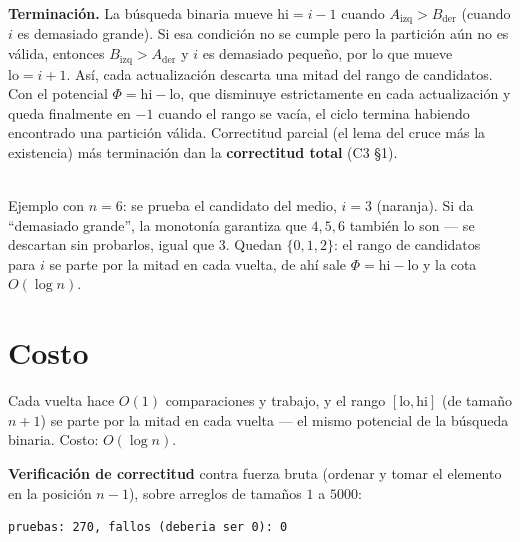 \documentclass[11pt]{article}
\begin{document}
\textbf{Terminación.} La búsqueda binaria mueve $\mathrm{hi}=i{-}1$ cuando $A_{\mathrm{izq}}>B_{\mathrm{der}}$
(cuando $i$ es demasiado grande). Si esa condición no se cumple pero la partición aún no es válida, entonces
$B_{\mathrm{izq}}>A_{\mathrm{der}}$ y $i$ es demasiado pequeño, por lo que mueve $\mathrm{lo}=i{+}1$.
Así, cada actualización descarta una mitad del rango de candidatos. Con el potencial $\Phi=\mathrm{hi}-\mathrm{lo}$,
que disminuye estrictamente en cada actualización y queda finalmente en $-1$ cuando el rango se vacía, el
ciclo termina habiendo encontrado una partición válida. Correctitud
parcial (el lema del cruce más la existencia) más terminación dan la \textbf{correctitud total} (C3 §1).

\begin{center}
\\[4pt]
{\footnotesize Ejemplo con $n=6$: se prueba el candidato del medio, $i=3$ (naranja). Si da ``demasiado
grande'', la monotonía garantiza que $4,5,6$ también lo son --- se descartan sin probarlos, igual que $3$.
Quedan $\{0,1,2\}$: el rango de candidatos para $i$ se parte por la mitad en cada vuelta, de ahí sale
$\Phi=\mathrm{hi}-\mathrm{lo}$ y la cota $O(\log n)$.}
\end{center}

\section{Costo}

Cada vuelta hace $O(1)$ comparaciones y trabajo, y el rango $[\mathrm{lo},\mathrm{hi}]$ (de tamaño $n{+}1$)
se parte por la mitad en cada vuelta --- el mismo potencial de la búsqueda binaria. Costo: $O(\log n)$.

\textbf{Verificación de correctitud} contra fuerza bruta (ordenar y tomar el elemento en la posición
$n{-}1$), sobre arreglos de tamaños $1$ a $5000$:
\begin{lstlisting}[style=salida]
pruebas: 270, fallos (deberia ser 0): 0
\end{lstlisting}
\end{document}
